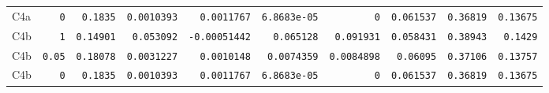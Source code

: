 \begin{longtable}{lrrrrrrrrr}
C4a & \texttt{0} & \texttt{0.1835} & \texttt{0.0010393} & \texttt{0.0011767} & \texttt{6.8683e-05} & \texttt{0} & \texttt{0.061537} & \texttt{0.36819} & \texttt{0.13675} \\
C4b & \texttt{1} & \texttt{0.14901} & \texttt{0.053092} & \texttt{-0.00051442} & \texttt{0.065128} & \texttt{0.091931} & \texttt{0.058431} & \texttt{0.38943} & \texttt{0.1429} \\
C4b & \texttt{0.05} & \texttt{0.18078} & \texttt{0.0031227} & \texttt{0.0010148} & \texttt{0.0074359} & \texttt{0.0084898} & \texttt{0.06095} & \texttt{0.37106} & \texttt{0.13757} \\
C4b & \texttt{0} & \texttt{0.1835} & \texttt{0.0010393} & \texttt{0.0011767} & \texttt{6.8683e-05} & \texttt{0} & \texttt{0.061537} & \texttt{0.36819} & \texttt{0.13675} \\
\end{longtable}
\endgroup


